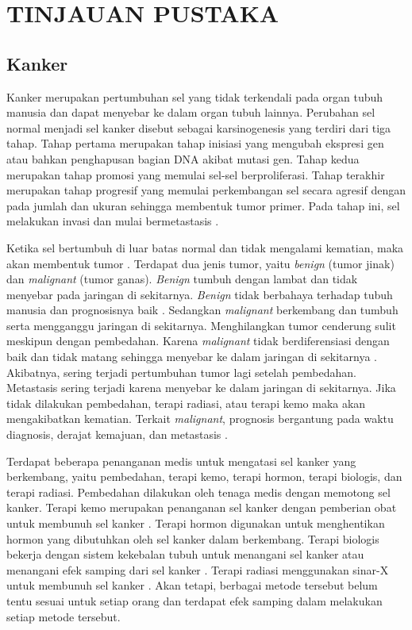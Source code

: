 \chapter{TINJAUAN PUSTAKA}

\section{Kanker}

    Kanker merupakan pertumbuhan sel yang tidak terkendali pada organ tubuh manusia dan dapat menyebar ke dalam organ tubuh lainnya. Perubahan sel normal menjadi sel kanker disebut sebagai karsinogenesis yang terdiri dari tiga tahap. Tahap pertama merupakan tahap inisiasi yang mengubah ekspresi gen atau bahkan penghapusan bagian DNA akibat mutasi gen. Tahap kedua merupakan tahap promosi yang memulai sel-sel berproliferasi. Tahap terakhir merupakan tahap progresif yang memulai perkembangan sel secara agresif dengan pada jumlah dan ukuran sehingga membentuk tumor primer. Pada tahap ini, sel melakukan invasi dan mulai bermetastasis \citep{Baranwal2021}.

    Ketika sel bertumbuh di luar batas normal dan tidak mengalami kematian, maka akan membentuk tumor \citep{Shedden-Mora2020}. Terdapat dua jenis tumor, yaitu \textit{benign} (tumor jinak) dan \textit{malignant} (tumor ganas). \textit{Benign} tumbuh dengan lambat dan tidak menyebar pada jaringan di sekitarnya. \textit{Benign} tidak berbahaya terhadap tubuh manusia dan prognosisnya baik \citep{Wu2021b}. Sedangkan \textit{malignant} berkembang dan tumbuh serta mengganggu jaringan di sekitarnya. Menghilangkan tumor cenderung sulit meskipun dengan pembedahan. Karena \textit{malignant} tidak berdiferensiasi dengan baik dan tidak matang sehingga menyebar ke dalam jaringan di sekitarnya \citep{li2022epidemiology}. Akibatnya, sering terjadi pertumbuhan tumor lagi setelah pembedahan. Metastasis sering terjadi karena menyebar ke dalam jaringan di sekitarnya. Jika tidak dilakukan pembedahan, terapi radiasi, atau terapi kemo maka akan mengakibatkan kematian. Terkait \textit{malignant}, prognosis bergantung pada waktu diagnosis, derajat kemajuan, dan metastasis \citep{Park2022}.

    Terdapat beberapa penanganan medis untuk mengatasi sel kanker yang berkembang, yaitu pembedahan, terapi kemo, terapi hormon, terapi biologis, dan terapi radiasi. Pembedahan dilakukan oleh tenaga medis dengan memotong sel kanker. Terapi kemo merupakan penanganan sel kanker dengan pemberian obat untuk membunuh sel kanker \citep{Strobel2019}. Terapi hormon digunakan untuk menghentikan hormon yang dibutuhkan oleh sel kanker dalam berkembang. Terapi biologis bekerja dengan sistem kekebalan tubuh untuk menangani sel kanker atau menangani efek samping dari sel kanker \citep{Waks2019}. Terapi radiasi menggunakan sinar-X untuk membunuh sel kanker \citep{Wu2021}. Akan tetapi, berbagai metode tersebut belum tentu sesuai untuk setiap orang dan terdapat efek samping dalam melakukan setiap metode tersebut.

